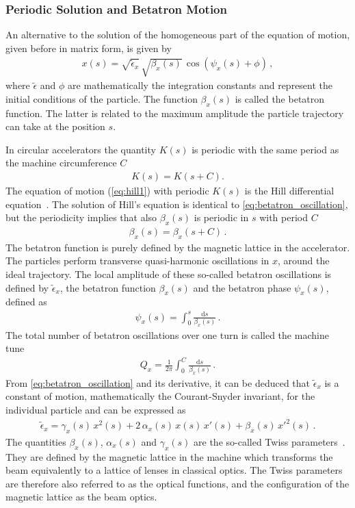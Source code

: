 \subsubsection{Periodic Solution and Betatron Motion}
An alternative to the solution of the homogeneous part of the equation of motion, given before in matrix form, is given by
%
\begin{align}
x(s) = \sqrt{\tilde{\epsilon}_x} \, \sqrt{\beta_x(s)} \, \cos \left( \psi_x(s) + \phi \right) \, , \label{eq:betatron_oscillation}
\end{align}
%
where $\tilde{\epsilon}$ and $\phi$ are mathematically the integration constants and represent the initial conditions of the particle. The function $\beta_x(s)$ is called the betatron function. The latter is related to the maximum amplitude the particle trajectory can take at the position $s$. 

\newpage
In circular accelerators the quantity $K(s)$ is periodic with the same period as the machine circumference $C$
\begin{align}
K(s) = K(s+C) .
\end{align}
The equation of motion (\ref{eq:hill1}) with periodic $K(s)$ is the Hill differential equation~\cite{wiedemann1999particle}. The solution of Hill's equation is identical to \eqref{eq:betatron_oscillation}, but the periodicity implies that also $\beta_x(s)$ is periodic in $s$ with period $C$
%
\begin{align}
  \beta_x (s) = \beta_x (s+C) \, .
\end{align}
The betatron function is purely defined by the magnetic lattice in the accelerator. The particles perform transverse quasi-harmonic oscillations in $x$, around the ideal trajectory. The local amplitude of these so-called betatron oscillations is defined by $\tilde{\epsilon}_x$, the betatron function $\beta_x(s)$ and the betatron phase $\psi_x(s)$, defined as
%
\begin{align}
  \psi_x(s) = \int_0^s \frac{\mathrm{d}s}{\beta_x(s)} \, .
\end{align}
%
The total number of betatron oscillations over one turn is called the machine tune
%
\begin{align}
  Q_x = \frac{1}{2 \pi} \int_0^C \frac{\mathrm{d}s}{\beta_x(s)} \, .
\end{align}
%
%
From \eqref{eq:betatron_oscillation} and its derivative, it can be deduced that $\tilde{\epsilon}_x$ is a constant of motion, mathematically the Courant-Snyder invariant, for the individual particle and can be expressed as
%
\begin{align}
\tilde{\epsilon}_x = \gamma_x(s) \, x^2(s) + 2 \, \alpha_x(s) \, x(s) \, x'(s) + \beta_x(s) \, x'^2 (s) \, . \label{eq:parameric_ellipse}
\end{align}
%
The quantities $\beta_x(s)$, $\alpha_x(s)$ and $\gamma_x(s)$ are the so-called Twiss parameters~\cite{wiedemann1999particle}. They are defined by the magnetic lattice in the machine which transforms the beam equivalently to a lattice of lenses in classical optics. The Twiss parameters are therefore also referred to as the optical functions, and the configuration of the magnetic lattice as the beam optics.

